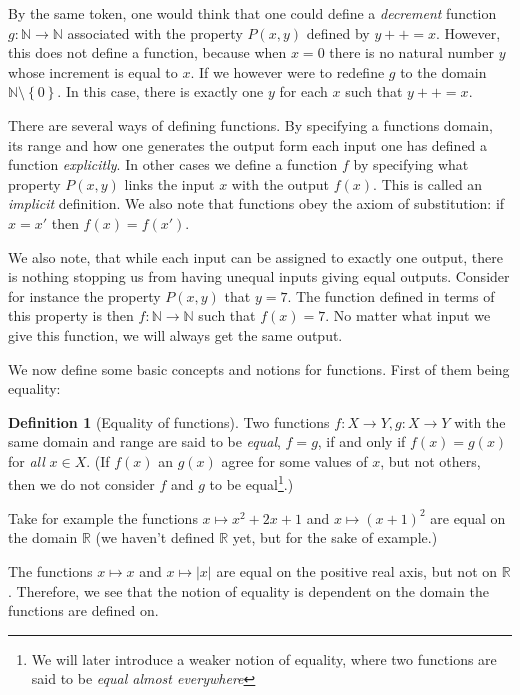 \documentclass[a4paper, twocolumn]{report}
\newcounter{dummy} \numberwithin{dummy}{section}
\theoremstyle{definition}
\newtheorem{defn}[dummy]{Definition}
\theoremstyle{solution}
\newcommand{\dplus}{{+}{+}} %
\begin{document}
By the same token, one would think that one could define a \textit{decrement}
function $g : \mathbb{N} \rightarrow \mathbb{N}$ associated with the property
$P(x, y)$ defined by $y \dplus = x$. However, this does not define a function,
because when $x = 0$ there is no natural number $y$ whose increment is equal to
$x$.  If we however were to redefine $g$ to the domain $\mathbb{N} \setminus
\left\{ 0 \right\}$.  In this case, there is exactly one $y$ for each $x$ such
that $y++ = x$. 


There are several ways of defining functions. By specifying a functions domain,
its range and how one generates the output form each input one has defined a
function \textit{explicitly}. In other cases we define a function $f$ by
specifying what property $P(x, y)$ links the input $x$ with the output $f(x)$.
This is called an \textit{implicit} definition.
We also note that functions obey the axiom of substitution: if $x = x'$ then
$f(x) = f(x')$.

We also note, that while each input can be assigned to exactly one output,
there is nothing stopping us from having unequal inputs giving equal outputs.
Consider for instance the property $P(x, y)$ that $y = 7$. The function defined
in terms of this property is then $f : \mathbb{N} \rightarrow \mathbb{N}$ such
that $f(x) = 7$. No matter what input we give this function, we will always get
the same output.

We now define some basic concepts and notions for functions. First of them being equality:

\begin{defn}[Equality of functions]
  \label{defn_337}
  Two functions $f : X \rightarrow Y, g : X \rightarrow Y$ with the same domain
  and range are said to be \textit{equal}, $f = g$, if and only if $f(x) =
  g(x)$ for \textit{all} $x \in X$. (If $f(x)$ an $g(x)$ agree for some values
    of $x$, but not others, then we do not consider $f$ and $g$ to be
    equal\footnote{We will later introduce a weaker notion of equality, where
      two functions are said to be \textit{equal almost everywhere}}.)
\end{defn}
\addtocounter{dummy}{2}

Take for example the functions $x \mapsto x^{2} + 2x + 1$ and $x \mapsto
(x+1)^{2}$ are equal on the domain $\mathbb{R}$ (we haven't defined
$\mathbb{R}$ yet, but for the sake of example.)

The functions $x \mapsto x$ and $x \mapsto |x|$ are equal on the positive real
axis, but not on $\mathbb{R}$. Therefore, we see that the notion of equality is
dependent on the domain the functions are defined on.
\end{document}
